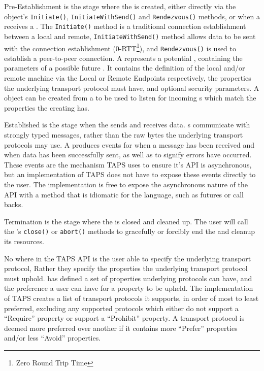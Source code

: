 Pre-Establishment is the stage where the \connection{} is created, either directly via the \preconnection{} object's
\texttt{Initiate()}, \texttt{InitiateWithSend()} and \texttt{Rendezvous()} methods, or when a \listener{} receives a
\connection{}.
The \texttt{Initiate()} method is a traditional connection establishment between a local and remote,
\texttt{InitiateWithSend()} method allows data to be sent with the connection establishment
(0-RTT\footnote{Zero Round Trip Time}), and \texttt{Rendezvous()} is used to establish a peer-to-peer connection.
A \preconnection{} represents a potential \connection{}, containing the parameters of a possible future \connection{}.
It contains the definition of the local and/or remote machine via the Local or Remote Endpoints respectively, the
properties the underlying transport protocol must have, and optional security parameters.
A \listener{} object can be created from a \preconnection{} to be used to listen for incoming \connection{}s which match
the properties the creating \preconnection{} has.

Established is the stage when the \connection{} sends and receives data.
\connection{}s communicate with strongly typed messages, rather than the raw bytes the underlying transport protocols
may use.
A \connection{} produces events for when a message has been received and when data has been successfully sent, as well as
to signify errors have occurred.
These events are the mechanism TAPS uses to ensure it's API is asynchronous, but an implementation of TAPS does not have
to expose these events directly to the user.
The implementation is free to expose the asynchronous nature of the API with a method that is idiomatic for the
language, such as futures or call backs.

Termination is the stage where the \connection{} is closed and cleaned up.
The user will call the \connection{}'s \texttt{close()} or \texttt{abort()} methods to gracefully or forcibly end
the \connection{} and cleanup its resources.

No where in the TAPS API is the user able to specify the underlying transport protocol, Rather they specify the
properties the underlying transport protocol must uphold.
\citet[§~5.2]{trammell_abstractapplicationlayer_2020} has defined a set of properties underlying protocols can have,
and the preference a user can have for a property to be upheld.
The implementation of TAPS creates a list of transport protocols it supports, in order of most to least preferred,
excluding any supported protocols which either do not support a “Require” property or support a “Prohibit” property.
A transport protocol is deemed more preferred over another if it contains more “Prefer” properties and/or less “Avoid”
properties.

